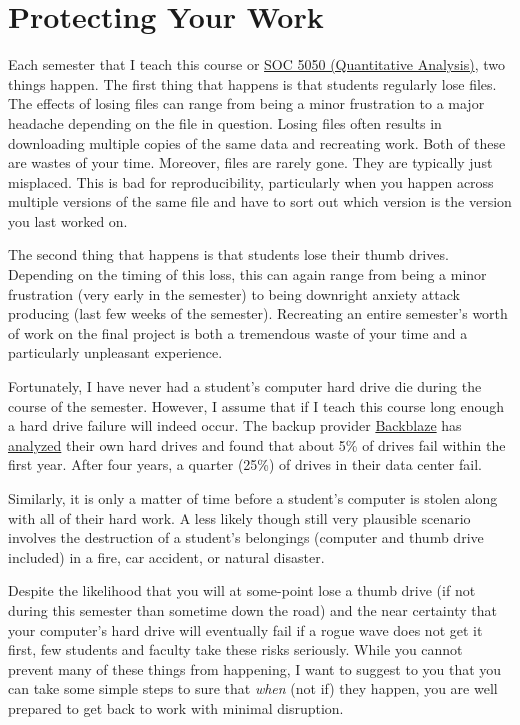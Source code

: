 \documentclass[]{book}
\theoremstyle{definition}
\theoremstyle{definition}
\theoremstyle{definition}
\theoremstyle{remark}
\begin{document}
\chapter{Protecting Your Work}\label{protecting-your-work}

Each semester that I teach this course or
\href{https://slu-soc5050.github.io}{SOC 5050 (Quantitative Analysis)},
two things happen. The first thing that happens is that students
regularly lose files. The effects of losing files can range from being a
minor frustration to a major headache depending on the file in question.
Losing files often results in downloading multiple copies of the same
data and recreating work. Both of these are wastes of your time.
Moreover, files are rarely gone. They are typically just misplaced. This
is bad for reproducibility, particularly when you happen across multiple
versions of the same file and have to sort out which version is the
version you last worked on.

The second thing that happens is that students lose their thumb drives.
Depending on the timing of this loss, this can again range from being a
minor frustration (very early in the semester) to being downright
anxiety attack producing (last few weeks of the semester). Recreating an
entire semester's worth of work on the final project is both a
tremendous waste of your time and a particularly unpleasant experience.

Fortunately, I have never had a student's computer hard drive die during
the course of the semester. However, I assume that if I teach this
course long enough a hard drive failure will indeed occur. The backup
provider \href{https://www.backblaze.com/}{Backblaze} has
\href{https://www.backblaze.com/blog/how-long-do-disk-drives-last/}{analyzed}
their own hard drives and found that about 5\% of drives fail within the
first year. After four years, a quarter (25\%) of drives in their data
center fail.

Similarly, it is only a matter of time before a student's computer is
stolen along with all of their hard work. A less likely though still
very plausible scenario involves the destruction of a student's
belongings (computer and thumb drive included) in a fire, car accident,
or natural disaster.

Despite the likelihood that you will at some-point lose a thumb drive
(if not during this semester than sometime down the road) and the near
certainty that your computer's hard drive will eventually fail if a
rogue wave does not get it first, few students and faculty take these
risks seriously. While you cannot prevent many of these things from
happening, I want to suggest to you that you can take some simple steps
to sure that \emph{when} (not if) they happen, you are well prepared to
get back to work with minimal disruption.
\end{document}
